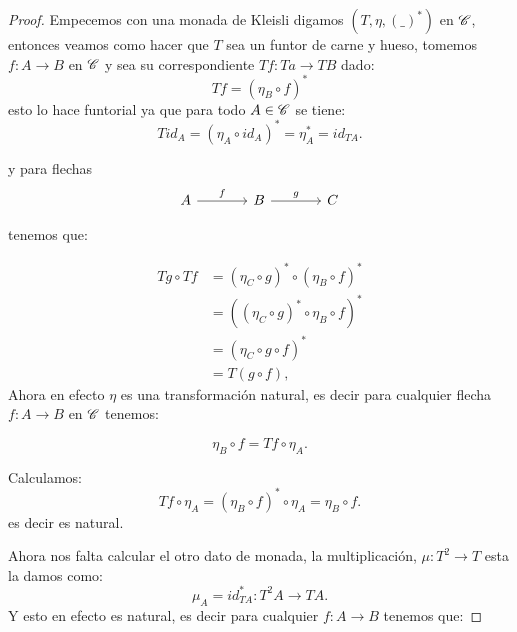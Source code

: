 \documentclass{comunicaciones}
\begin{document}
\begin{proof}
Empecemos con una monada de Kleisli digamos $(T,\eta,(\_)^{*})$ en $\EuScript{C}$, entonces veamos como hacer que $T$ sea un funtor de carne y hueso, tomemos $f\colon A\rightarrow B$ en $\EuScript{C}$
y sea su correspondiente $Tf\colon Ta\rightarrow TB$ dado: \[Tf=(\eta_{B}\circ f)^{*}\] esto lo hace funtorial ya que para todo $A\in\EuScript{C}$ se tiene: 
\[Tid_{A}=(\eta_{A}\circ id_{A})^{*}=\eta_{A}^{*}=id_{TA}.\]

y para flechas \[\begin{tikzcd}[column sep=large, row sep=large]
    A \arrow[r, "f"]  & B \arrow[r, "g"] & C
    \end{tikzcd}\]

tenemos que: 

\[
    \begin{aligned}
        Tg\circ Tf
        &= (\eta_{C}\circ g)^{*}\circ (\eta_{B}\circ f)^{*} \\
        &= ((\eta_{C}\circ g)^{*}\circ\eta_{B}\circ f)^{*}\\
        &= (\eta_{C}\circ g\circ f)^{*} \\
        &=T(g\circ f),
    \end{aligned}\]
Ahora en efecto $\eta$ es una transformación natural, es decir para cualquier flecha $f\colon A\rightarrow B$ en $\EuScript{C}$ tenemos:

\[\eta_{B}\circ f=Tf\circ\eta_{A}.\]

Calculamos: \[Tf\circ\eta_{A}=(\eta_{B}\circ f)^{*}\circ\eta_{A}=\eta_{B}\circ f.\]
es decir es natural.

Ahora nos falta calcular el otro dato de monada, la multiplicación, $\mu\colon T^{2}\rightarrow T$ esta la damos como: \[\mu_{A}= id_{TA}^{*}\colon T^{2}A\rightarrow TA.\]
Y esto en efecto es natural, es decir para cualquier $f\colon A\rightarrow B$ tenemos que: 



\end{proof}
\end{document}
